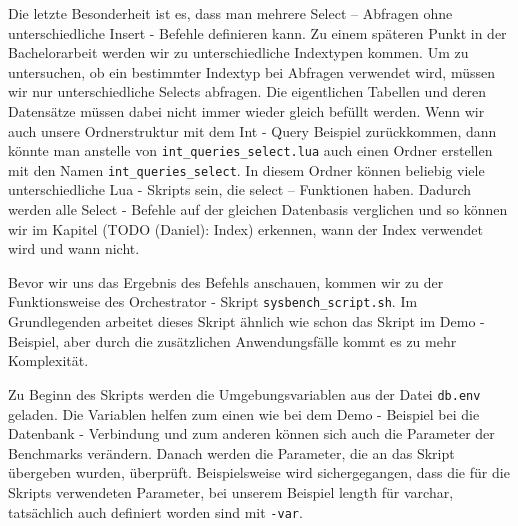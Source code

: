 \label{itm:mehrere_selects}
Die letzte Besonderheit ist es, dass man mehrere Select – Abfragen ohne unterschiedliche Insert - Befehle definieren kann.
Zu einem späteren Punkt in der Bachelorarbeit werden wir zu unterschiedliche Indextypen kommen.
Um zu untersuchen, ob ein bestimmter Indextyp bei Abfragen verwendet wird, müssen wir nur unterschiedliche Selects abfragen.
Die eigentlichen Tabellen und deren Datensätze müssen dabei nicht immer wieder gleich befüllt werden.
Wenn wir auch unsere Ordnerstruktur mit dem Int - Query Beispiel zurückkommen, dann könnte man anstelle von \texttt{int\_queries\_select.lua} auch einen Ordner erstellen mit den Namen \texttt{int\_queries\_select}.
In diesem Ordner können beliebig viele unterschiedliche Lua - Skripts sein, die select – Funktionen haben.
Dadurch werden alle Select - Befehle auf der gleichen Datenbasis verglichen und so können wir im Kapitel (TODO (Daniel): Index) erkennen, wann der Index verwendet wird und wann nicht.

Bevor wir uns das Ergebnis des Befehls anschauen, kommen wir zu der Funktionsweise des Orchestrator - Skript \texttt{sysbench\_script.sh}.
Im Grundlegenden arbeitet dieses Skript ähnlich wie schon das Skript im Demo - Beispiel, aber durch die zusätzlichen Anwendungsfälle kommt es zu mehr Komplexität.

Zu Beginn des Skripts werden die Umgebungsvariablen aus der Datei \texttt{db.env} geladen.
Die Variablen helfen zum einen wie bei dem Demo - Beispiel bei die Datenbank - Verbindung und zum anderen können sich auch die Parameter der Benchmarks verändern.
Danach werden die Parameter, die an das Skript übergeben wurden, überprüft.
Beispielsweise wird sichergegangen, dass die für die Skripts verwendeten Parameter, bei unserem Beispiel length für varchar, tatsächlich auch definiert worden sind mit \texttt{-var}.

